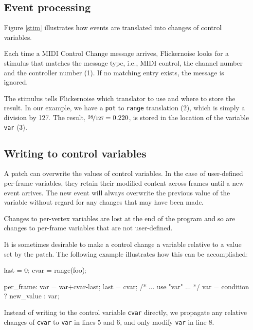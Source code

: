 \documentclass[11pt,a4paper]{article}
\begin{document}


\figstim

\subsection{Event processing}

Figure \ref{stim} illustrates how events are translated into changes
of control variables.

Each time a MIDI Control Change message arrives, Flickernoise looks for a
stimulus that matches the message type, i.e., MIDI control, the channel
number and the controller number (1). If no matching entry exists,
the message is ignored.

The stimulus tells Flickernoise which translator to use and where
to store the result. In our example, we have a {\tt pot} to {\tt range}
translation (2), which is simply a division by 127. The result,
$\nicefrac{28}{127}=0.220$, is stored in the location of the variable
{\tt var} (3).




\subsection{Writing to control variables}

A patch can overwrite the values of control variables. In the case of
user-defined per-frame variables, they retain their modified content across
frames until a new event arrives. The new event will always overwrite
the previous value of the variable without regard for any changes that
may have been made.

Changes to per-vertex variables are lost at the end of the program
and so are changes to per-frame variables that are not user-defined.

It is sometimes desirable to make a control change a variable relative
to a value set by the patch. The following example illustrates how
this can be accomplished:

\begin{listing}{1}
last = 0;
cvar = range(foo);

per_frame:
	var = var+cvar-last;
	last = cvar;
	/* ... use "var" ... */
	var = condition ? new_value : var;
\end{listing}

Instead of writing to the control variable {\tt cvar} directly, we
propagate any relative changes of {\tt cvar} to {\tt var} in lines
5 and 6, and only modify {\tt var} in line 8.
\end{document}
